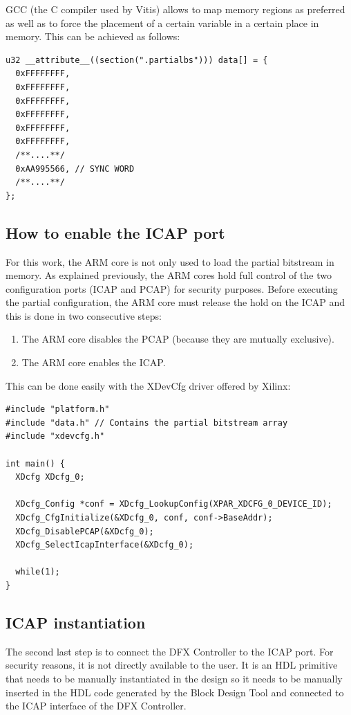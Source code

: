 GCC (the C compiler used by Vitis) allows to map memory regions as preferred as well as to force the placement of a certain variable in a certain place in memory. This can be achieved as follows:

\begin{lstlisting}[style=C]
u32 __attribute__((section(".partialbs"))) data[] = {
  0xFFFFFFFF,
  0xFFFFFFFF,
  0xFFFFFFFF,
  0xFFFFFFFF,
  0xFFFFFFFF,
  0xFFFFFFFF,
  /**....**/
  0xAA995566, // SYNC WORD
  /**....**/
};
\end{lstlisting}

\subsection{How to enable the ICAP port}
For this work, the ARM core is not only used to load the partial bitstream in memory. As explained previously, the ARM cores hold full control of the two configuration ports (ICAP and PCAP) for security purposes. Before executing the partial configuration, the ARM core must release the hold on the ICAP and this is done in two consecutive steps:
\begin{enumerate}
    \item The ARM core disables the PCAP (because they are mutually exclusive).
    \item The ARM core enables the ICAP.
\end{enumerate}

This can be done easily with the XDevCfg driver offered by Xilinx:

\begin{lstlisting}[style=C]
#include "platform.h"
#include "data.h" // Contains the partial bitstream array
#include "xdevcfg.h"

int main() {
  XDcfg XDcfg_0;

  XDcfg_Config *conf = XDcfg_LookupConfig(XPAR_XDCFG_0_DEVICE_ID);
  XDcfg_CfgInitialize(&XDcfg_0, conf, conf->BaseAddr);
  XDcfg_DisablePCAP(&XDcfg_0);
  XDcfg_SelectIcapInterface(&XDcfg_0);

  while(1);
}

\end{lstlisting}


\subsection{ICAP instantiation}
The second last step is to connect the DFX Controller to the ICAP port. For security reasons, it is not directly available to the user. It is an HDL primitive that needs to be manually instantiated in the design so it needs to be manually inserted in the HDL code generated by the Block Design Tool and connected to the ICAP interface of the DFX Controller. \bigskip


